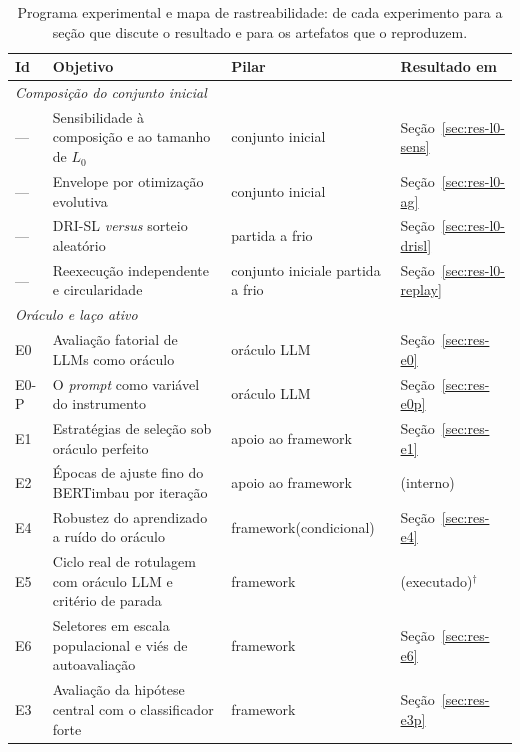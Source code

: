 \begin{table}[htb]
\centering
\caption{Programa experimental e mapa de rastreabilidade: de cada experimento
para a seção que discute o resultado e para os artefatos que o reproduzem.}
\label{tab:metodo-experimentos}
\small
\begin{tabular}{@{}l p{63mm} p{34mm} l@{}}
\toprule
\textbf{Id} & \textbf{Objetivo} & \textbf{Pilar} & \textbf{Resultado em} \\
\midrule
\multicolumn{4}{l}{\textit{Composição do conjunto inicial}}\\
--- & Sensibilidade à composição e ao tamanho de $L_0$ & conjunto inicial & Seção~\ref{sec:res-l0-sens} \\
--- & Envelope por otimização evolutiva & conjunto inicial & Seção~\ref{sec:res-l0-ag} \\
--- & DRI-SL \textit{versus} sorteio aleatório & partida a frio & Seção~\ref{sec:res-l0-drisl} \\
--- & Reexecução independente e circularidade & conjunto inicial\newline e partida a frio & Seção~\ref{sec:res-l0-replay} \\
\midrule
\multicolumn{4}{l}{\textit{Oráculo e laço ativo}}\\
E0 & Avaliação fatorial de LLMs como oráculo & oráculo LLM & Seção~\ref{sec:res-e0} \\
E0-P & O \textit{prompt} como variável do instrumento & oráculo LLM & Seção~\ref{sec:res-e0p} \\
E1 & Estratégias de seleção sob oráculo perfeito & apoio ao framework & Seção~\ref{sec:res-e1} \\
E2 & Épocas de ajuste fino do BERTimbau por iteração & apoio ao framework & (interno) \\
E4 & Robustez do aprendizado a ruído do oráculo & framework\newline (condicional) & Seção~\ref{sec:res-e4} \\
E5 & Ciclo real de rotulagem com oráculo LLM e critério de parada & framework & (executado)$^{\dagger}$ \\
E6 & Seletores em escala populacional e viés de autoavaliação & framework & Seção~\ref{sec:res-e6} \\
E3 & Avaliação da hipótese central com o classificador forte & framework & Seção~\ref{sec:res-e3p} \\
\bottomrule
\end{tabular}


\end{table}
